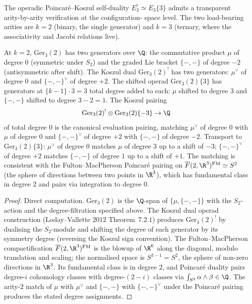 The operadic Poincar\'e--Koszul self-duality $E_3^! \simeq E_3\{3\}$
admits a transparent arity-by-arity verification at the configuration-
space level. The two load-bearing arities are $k = 2$ (binary, the
single generator) and $k = 3$ (ternary, where the associativity and
Jacobi relations live).

\begin{proposition}
\label{prop:arity-2-e3-check-cfg2026}
\ClaimStatusProvedHere
At $k = 2$, $\mathrm{Ger}_3(2)$ has two generators over $\Q$: the
commutative product $\mu$ of degree $0$ (symmetric under $S_2$) and the
graded Lie bracket $\{-, -\}$ of degree $-2$ (antisymmetric after
shift). The Koszul dual $\mathrm{Ger}_3(2)^!$ has two generators:
$\mu^\vee$ of degree $0$ and $\{-, -\}^\vee$ of degree $+2$. The
shifted operad $\mathrm{Ger}_3(2)\{3\}$ has generators at
$\{k-1\} \cdot 3 = 3$ total degree added to each: $\mu$ shifted to
degree $3$ and $\{-, -\}$ shifted to degree $3 - 2 = 1$. The Koszul
pairing
\[
  \mathrm{Ger}_3(2)^! \otimes \mathrm{Ger}_3(2)\{-3\} \to \Q
\]
of total degree $0$ is the canonical evaluation pairing, matching
$\mu^\vee$ of degree $0$ with $\mu$ of degree $0$ and $\{-, -\}^\vee$ of
degree $+2$ with $\{-, -\}$ of degree $-2$. Transport to
$\mathrm{Ger}_3(2)\{3\}$: $\mu^\vee$ of degree $0$ matches $\mu$ of
degree $3$ up to a shift of $-3$; $\{-, -\}^\vee$ of degree $+2$ matches
$\{-, -\}$ of degree $1$ up to a shift of $+1$. The matching is
consistent with the Fulton--MacPherson Poincar\'e pairing on
$\overline{F}(2, \R^3)^{\mathrm{FM}} \simeq S^2$
(the sphere of directions between two points in $\R^3$), which has
fundamental class in degree $2$ and pairs via integration to degree $0$.
\end{proposition}

\begin{proof}
Direct computation. $\mathrm{Ger}_3(2)$ is the $\Q$-span of
$\{\mu, \{-, -\}\}$ with the $S_2$-action and the degree-filtration
specified above. The Koszul dual operad construction (Loday--Vallette
$2012$ Theorem~$7.2.1$) produces $\mathrm{Ger}_3(2)^!$ by dualising the
$S_2$-module and shifting the degree of each generator by its
symmetry degree (reversing the Koszul sign convention). The
Fulton--MacPherson compactification $\overline{F}(2, \R^3)^{\mathrm{FM}}$
is the blowup of $\R^6$ along the diagonal, modulo translation and
scaling; the normalised space is $S^{3 - 1} = S^2$, the sphere of
non-zero directions in $\R^3$. Its fundamental class is in degree $2$,
and Poincar\'e duality pairs degree-$i$ cohomology classes with
degree-$(2 - i)$ classes via
$\int_{S^2} \alpha \wedge \beta \in \Q$. The arity-$2$ match of
$\mu$ with $\mu^\vee$ and $\{-, -\}$ with $\{-, -\}^\vee$ under the
Poincar\'e pairing produces the stated degree assignments.
\end{proof}

